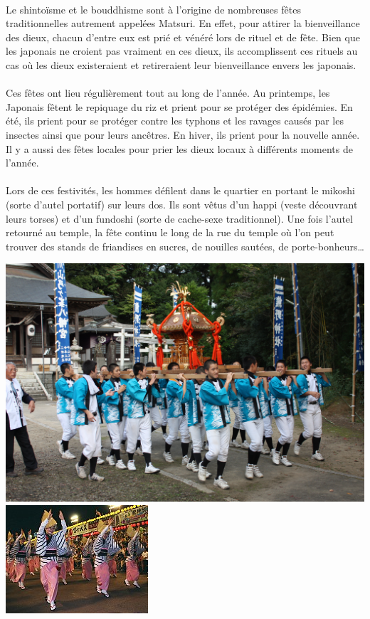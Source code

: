 \paragraph{}
Le shintoïsme et le bouddhisme sont à l’origine de nombreuses fêtes traditionnelles autrement appelées Matsuri. En effet, pour attirer la bienveillance des dieux, chacun d’entre eux est prié et vénéré lors de rituel et de fête. Bien que les japonais ne croient pas vraiment en ces dieux, ils accomplissent ces rituels au cas où les dieux existeraient et retireraient leur bienveillance envers les japonais.
\paragraph{}
Ces fêtes ont lieu régulièrement tout au long de l’année. Au printemps, les Japonais fêtent le repiquage du riz et prient pour se protéger des épidémies. En été, ils prient pour se protéger contre les typhons et les ravages causés par les insectes ainsi que pour leurs ancêtres.  En hiver, ils prient pour la nouvelle année. Il y a aussi des fêtes locales pour prier les dieux locaux à différents moments de l’année. 
\paragraph{}
Lors de ces festivités, les hommes défilent dans le quartier en portant le mikoshi (sorte d’autel portatif) sur leurs dos. Ils sont vêtus d’un happi (veste découvrant leurs torses) et d’un fundoshi (sorte de cache-sexe traditionnel). Une fois l’autel retourné au temple, la fête continu le long de la rue du temple où l’on peut trouver des stands de friandises en sucres, de nouilles sautées, de porte-bonheurs… 
\begin{center}
\includegraphics[scale=0.07]{mikoshi.jpg}
\includegraphics[scale=1.3]{odori.jpg}
\end{center}
